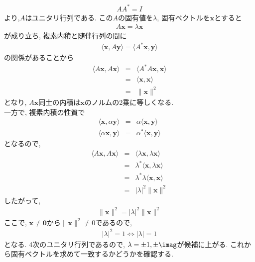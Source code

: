\begin{enumerate}[(1)]
\begin{eqnarray*}
        AA^{\ast}=I
    \end{eqnarray*}
    より,$A$はユニタリ行列である. この$A$の固有値を$\lambda$, 固有ベクトルを$\bm{x}$とすると
    \begin{eqnarray*}
        A\bm{x}=\lambda \bm{x}
    \end{eqnarray*}
    が成り立ち, 複素内積と随伴行列の間に
    \begin{eqnarray*}
        \langle \bm{x},A\bm{y}\rangle = \langle A^{\ast}\bm{x},\bm{y}\rangle
    \end{eqnarray*}
    の関係があることから
    \begin{eqnarray*}
        \langle A\bm{x},A\bm{x}\rangle &=& \langle A^{\ast}A\bm{x},\bm{x}\rangle\\
                                       &=&\langle \bm{x},\bm{x}\rangle\\
                                       &=&\|\bm{x}\|^{2}
    \end{eqnarray*}
    となり, $A\bm{x}$同士の内積は$\bm{x}$のノルムの2乗に等しくなる.\\
    一方で, 複素内積の性質で
    \begin{eqnarray*}
        \langle \bm{x},\alpha \bm{y}\rangle &=& \alpha \langle \bm{x},\bm{y}\rangle \\
        \langle \alpha \bm{x},\bm{y}\rangle &=& \alpha^{\ast}\langle \bm{x},\bm{y}\rangle
    \end{eqnarray*}
    となるので,
    \begin{eqnarray*}
        \langle A\bm{x},A\bm{x}\rangle &=& \langle \lambda \bm{x},\lambda \bm{x}\rangle \\
                                       &=&\lambda^{\ast}\langle \bm{x},\lambda \bm{x}\rangle\\
                                       &=& \lambda^{\ast}\lambda \langle \bm{x},\bm{x}\rangle\\
                                       &=&|\lambda|^{2}\|\bm{x}\|^{2}
    \end{eqnarray*}
    したがって,
    \begin{eqnarray*}
      \|\bm{x}\|^{2} = |\lambda|^{2}\|\bm{x}\|^{2}
    \end{eqnarray*}
    ここで, $\bm{x}\neq \bm{0}$から$\|\bm{x}\|^{2}\neq 0$であるので,
    \begin{eqnarray*}
      |\lambda|^{2} = 1\Longleftrightarrow |\lambda| = 1
    \end{eqnarray*}
    となる. 4次のユニタリ行列であるので, $\lambda =\pm 1,\pm \imag$が候補に上がる. これから固有ベクトルを求めて一致するかどうかを確認する.

\end{enumerate}
